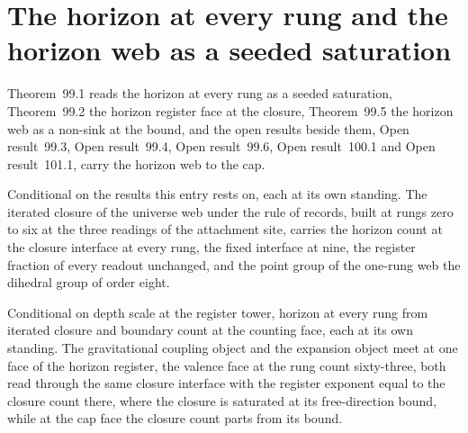 \section{The horizon at every rung and the horizon web as a seeded saturation}\label{mod:X-3-horizon-at-every-rung-and-the-horizon-web-as-a-seeded-saturation}
\label{narr:open:10-3}Theorem~99.1 reads the horizon at every rung as a seeded saturation, Theorem~99.2 the horizon register face at the closure, Theorem~99.5 the horizon web as a non-sink at the bound, and the open results beside them, Open result~99.3, Open result~99.4, Open result~99.6, Open result~100.1 and Open result~101.1, carry the horizon web to the cap.
\begin{chconditional}\label{box:X-3-horizon-at-every-rung-and-the-horizon-web-as-a-seeded-saturation:1}
Conditional on the results this entry rests on, each at its own standing. The iterated closure of the universe web under the rule of records, built at rungs zero to six at the three readings of the attachment site, carries the horizon count at the closure interface at every rung, the fixed interface at nine, the register fraction of every readout unchanged, and the point group of the one-rung web the dihedral group of order eight.
\end{chconditional}
\begin{chconditional}\label{box:X-3-horizon-at-every-rung-and-the-horizon-web-as-a-seeded-saturation:2}
Conditional on depth scale at the register tower, horizon at every rung from iterated closure and boundary count at the counting face, each at its own standing. The gravitational coupling object and the expansion object meet at one face of the horizon register, the valence face at the rung count sixty-three, both read through the same closure interface with the register exponent equal to the closure count there, where the closure is saturated at its free-direction bound, while at the cap face the closure count parts from its bound.
\end{chconditional}
